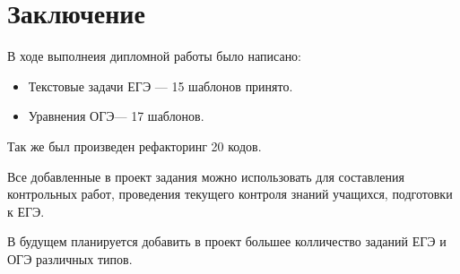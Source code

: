 \section*{Заключение}
В ходе выполнеия дипломной работы было написано:
		      \begin{itemize}
			      \item Текстовые задачи ЕГЭ — 15 шаблонов принято.
			      \item Уравнения ОГЭ— 17 шаблонов.
		      \end{itemize}
Так же был произведен рефакторинг 20 кодов.

Все добавленные в проект задания можно использовать для составления контрольных работ, проведения текущего контроля знаний учащихся, подготовки к ЕГЭ.

В будущем планируется добавить в проект большее колличество заданий ЕГЭ и ОГЭ различных типов.


